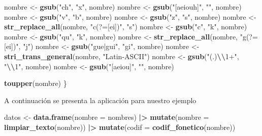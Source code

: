 \documentclass[
  12pt,
]{book}
\newenvironment{Shaded}{\begin{snugshade}}{\end{snugshade}}
\newcommand{\AttributeTok}[1]{\textcolor[rgb]{0.13,0.29,0.53}{#1}}
\newcommand{\FunctionTok}[1]{\textcolor[rgb]{0.13,0.29,0.53}{\textbf{#1}}}
\newcommand{\NormalTok}[1]{#1}
\newcommand{\OtherTok}[1]{\textcolor[rgb]{0.56,0.35,0.01}{#1}}
\newcommand{\SpecialCharTok}[1]{\textcolor[rgb]{0.81,0.36,0.00}{\textbf{#1}}}
\newcommand{\StringTok}[1]{\textcolor[rgb]{0.31,0.60,0.02}{#1}}
\begin{document}
\begin{Shaded}
\begin{Highlighting}[]
\NormalTok{  nombre }\OtherTok{\textless{}{-}} \FunctionTok{gsub}\NormalTok{(}\StringTok{"ch"}\NormalTok{, }\StringTok{"x"}\NormalTok{, nombre)}
\NormalTok{  nombre }\OtherTok{\textless{}{-}} \FunctionTok{gsub}\NormalTok{(}\StringTok{"[aeiouh]"}\NormalTok{, }\StringTok{""}\NormalTok{, nombre)}
\NormalTok{  nombre }\OtherTok{\textless{}{-}} \FunctionTok{gsub}\NormalTok{(}\StringTok{"v"}\NormalTok{, }\StringTok{"b"}\NormalTok{, nombre)}
\NormalTok{  nombre }\OtherTok{\textless{}{-}} \FunctionTok{gsub}\NormalTok{(}\StringTok{"z"}\NormalTok{, }\StringTok{"s"}\NormalTok{, nombre)}
\NormalTok{  nombre }\OtherTok{\textless{}{-}} \FunctionTok{str\_replace\_all}\NormalTok{(nombre, }\StringTok{"c(?=[ei])"}\NormalTok{, }\StringTok{"s"}\NormalTok{)  }
\NormalTok{  nombre }\OtherTok{\textless{}{-}} \FunctionTok{gsub}\NormalTok{(}\StringTok{"c"}\NormalTok{, }\StringTok{"k"}\NormalTok{, nombre)          }
\NormalTok{  nombre }\OtherTok{\textless{}{-}} \FunctionTok{gsub}\NormalTok{(}\StringTok{"qu"}\NormalTok{, }\StringTok{"k"}\NormalTok{, nombre)}
\NormalTok{  nombre }\OtherTok{\textless{}{-}} \FunctionTok{str\_replace\_all}\NormalTok{(nombre, }\StringTok{"g(?=[ei])"}\NormalTok{, }\StringTok{"j"}\NormalTok{)}
\NormalTok{  nombre }\OtherTok{\textless{}{-}} \FunctionTok{gsub}\NormalTok{(}\StringTok{"gue|gui"}\NormalTok{, }\StringTok{"gi"}\NormalTok{, nombre)}
\NormalTok{  nombre }\OtherTok{\textless{}{-}} \FunctionTok{stri\_trans\_general}\NormalTok{(nombre, }\StringTok{"Latin{-}ASCII"}\NormalTok{)  }
\NormalTok{  nombre }\OtherTok{\textless{}{-}} \FunctionTok{gsub}\NormalTok{(}\StringTok{"(.)}\SpecialCharTok{\textbackslash{}\textbackslash{}}\StringTok{1+"}\NormalTok{, }\StringTok{"}\SpecialCharTok{\textbackslash{}\textbackslash{}}\StringTok{1"}\NormalTok{, nombre)  }
\NormalTok{  nombre }\OtherTok{\textless{}{-}} \FunctionTok{gsub}\NormalTok{(}\StringTok{"[aeiou]"}\NormalTok{, }\StringTok{""}\NormalTok{, nombre)}
  
  \FunctionTok{toupper}\NormalTok{(nombre)}
\NormalTok{\}}
\end{Highlighting}
\end{Shaded}

A continuación se presenta la aplicación para nuestro ejemplo

\begin{Shaded}
\begin{Highlighting}[]
\NormalTok{datos }\OtherTok{\textless{}{-}} \FunctionTok{data.frame}\NormalTok{(}\AttributeTok{nombre =}\NormalTok{ nombres) }\SpecialCharTok{|\textgreater{}} 
         \FunctionTok{mutate}\NormalTok{(}\AttributeTok{nombre =} \FunctionTok{limpiar\_texto}\NormalTok{(nombre)) }\SpecialCharTok{|\textgreater{}} 
         \FunctionTok{mutate}\NormalTok{(}\AttributeTok{codif =} \FunctionTok{codif\_fonetico}\NormalTok{(nombre))}
\end{Highlighting}
\end{Shaded}
\end{document}
